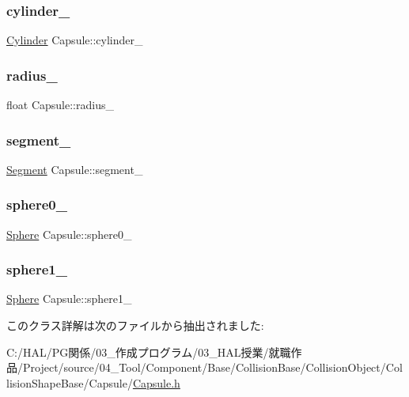 \subsubsection{\texorpdfstring{cylinder\+\_\+}{cylinder\_}}
{\footnotesize\ttfamily \mbox{\hyperlink{class_cylinder}{Cylinder}} Capsule\+::cylinder\+\_\+}

\mbox{\label{class_capsule_a5a479b152df710dba41b6529cf11199c}} 
\subsubsection{\texorpdfstring{radius\+\_\+}{radius\_}}
{\footnotesize\ttfamily float Capsule\+::radius\+\_\+}

\mbox{\label{class_capsule_a9557489d45b8a343f58d815965be988c}} 
\subsubsection{\texorpdfstring{segment\+\_\+}{segment\_}}
{\footnotesize\ttfamily \mbox{\hyperlink{class_segment}{Segment}} Capsule\+::segment\+\_\+}

\mbox{\label{class_capsule_a37c7db7fe8cb06be2f374d7aba24267e}} 
\subsubsection{\texorpdfstring{sphere0\+\_\+}{sphere0\_}}
{\footnotesize\ttfamily \mbox{\hyperlink{class_sphere}{Sphere}} Capsule\+::sphere0\+\_\+}

\mbox{\label{class_capsule_ac478efc95993a85908a7cd2759133ab2}} 
\subsubsection{\texorpdfstring{sphere1\+\_\+}{sphere1\_}}
{\footnotesize\ttfamily \mbox{\hyperlink{class_sphere}{Sphere}} Capsule\+::sphere1\+\_\+}



このクラス詳解は次のファイルから抽出されました\+:\begin{DoxyCompactItemize}
\item 
C\+:/\+H\+A\+L/\+P\+G関係/03\+\_\+作成プログラム/03\+\_\+\+H\+A\+L授業/就職作品/\+Project/source/04\+\_\+\+Tool/\+Component/\+Base/\+Collision\+Base/\+Collision\+Object/\+Collision\+Shape\+Base/\+Capsule/\mbox{\hyperlink{_capsule_8h}{Capsule.\+h}}\end{DoxyCompactItemize}
